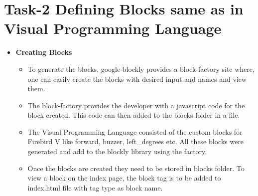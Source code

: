 \documentclass[a4paper,10pt]{report}
\begin{document}
\section{Task-2 Defining Blocks same as in Visual Programming Language}
  \begin{itemize}
   \item \textbf{Creating Blocks}\\
    \begin{itemize}
      \item 
      To generate the blocks, google-blockly provides a block-factory site where, one can easily create the blocks with desired input and names and view them.
      \item
      The block-factory provides the developer with a javascript code for the block created. This code can then added to the blocks folder in a file.
      \item
      The Visual Programming Language consisted of the custom blocks for Firebird V like forward, buzzer, left\_degrees etc. All these 
      blocks were generated and add to the blockly library using the factory.
      \item 
      Once the blocks are created they need to be stored in blocks folder. To view a block on the index page, the block tag
      is to be added to index.html file with tag type as block name.
    \end{itemize}
    

\end{itemize}
\end{document}
